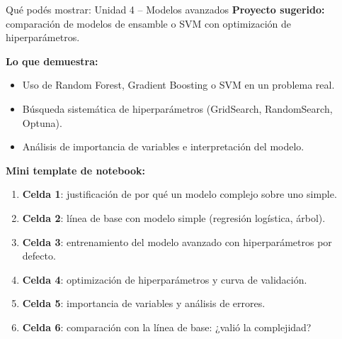 \documentclass[aspectratio=169]{beamer}
\begin{document}
\begin{frame}{Qué podés mostrar: Unidad 4 -- Modelos avanzados}
  \textbf{Proyecto sugerido:} comparación de modelos de ensamble o SVM con optimización de hiperparámetros.

  \bigskip
  \textbf{Lo que demuestra:}
  \begin{itemize}
    \item Uso de Random Forest, Gradient Boosting o SVM en un problema real.
    \item Búsqueda sistemática de hiperparámetros (GridSearch, RandomSearch, Optuna).
    \item Análisis de importancia de variables e interpretación del modelo.
  \end{itemize}

  \bigskip
  \textbf{Mini template de notebook:}
  \begin{enumerate}
    \item \textbf{Celda 1}: justificación de por qué un modelo complejo sobre uno simple.
    \item \textbf{Celda 2}: línea de base con modelo simple (regresión logística, árbol).
    \item \textbf{Celda 3}: entrenamiento del modelo avanzado con hiperparámetros por defecto.
    \item \textbf{Celda 4}: optimización de hiperparámetros y curva de validación.
    \item \textbf{Celda 5}: importancia de variables y análisis de errores.
    \item \textbf{Celda 6}: comparación con la línea de base: ¿valió la complejidad?
  \end{enumerate}
\end{frame}
\end{document}
